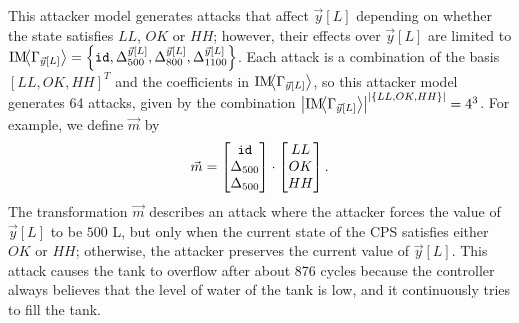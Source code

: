{{\begin{example}
  This attacker model generates attacks that affect $\vec{y}[L]$  depending on whether the state satisfies $LL$, $OK$ or $HH$; 
  however, their effects over $\vec{y}[L]$ are limited to $\text{IM}\!{{\left<\Gamma_{\vec{y}[L]}\right>}}=\left\{{\texttt{id}}, {\Delta}^{\vec{y}[L]}_{500}, {\Delta}^{\vec{y}[L]}_{800}, {\Delta}^{\vec{y}[L]}_{1100}\right\}$. Each attack is a combination of the basis $[LL, OK, HH]^T$ and the coefficients in $\text{IM}\!{{\left<\Gamma_{\vec{y}[L]}\right>}}$, so this attacker model generates 64 attacks, given by the combination ${\left|\text{IM}\!{{\left<\Gamma_{\vec{y}[L]}\right>}}\right|}^{\left|\left\{LL,OK,HH\right\}\right|}=4^3$. For example, we define $\vec{m}$ by
\begin{align}
  \vec{m}=
  \begin{bmatrix}
    {\texttt{id}} \\
    {\Delta}_{500} \\
    {\Delta}_{500}
  \end{bmatrix}
  \cdot
  \begin{bmatrix}
    LL \\
    OK\\
    HH
  \end{bmatrix}.
\end{align}
The transformation $\vec{m}$ describes an attack where the attacker forces the value of $\vec{y}[L]$ to be $500$ L, but only when the current state of the CPS satisfies either $OK$ or $HH$; otherwise, the attacker preserves the current value of $\vec{y}[L]$. This attack causes the tank to overflow after about 876 cycles because the controller always believes that the level of water of the tank is low, and it continuously tries to fill the tank.
\end{example}
}}
